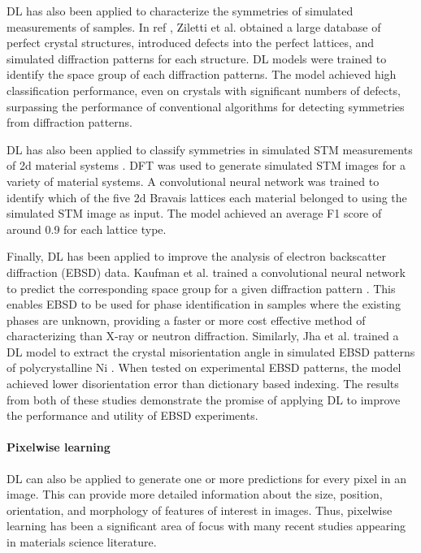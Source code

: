 \documentclass[pdflatex,sn-mathphys]{sn-jnl}%
\theoremstyle{thmstyleone}%
\theoremstyle{thmstyletwo}%
\theoremstyle{thmstylethree}%
\begin{document}
DL has also been applied to characterize the symmetries of simulated measurements of samples. In ref \cite{Ziletti2018}, Ziletti et al. obtained a large database of perfect crystal structures, introduced defects into the perfect lattices, and simulated diffraction patterns for each structure. DL models were trained to identify the space group of each diffraction patterns. The model achieved high classification performance, even on crystals with significant numbers of defects, surpassing the performance of conventional algorithms for detecting symmetries from diffraction patterns. 

DL has also been applied to classify symmetries in simulated STM measurements of 2d material systems \cite{choudhary2021computational}.  DFT was used to generate simulated STM images for a variety of material systems. A convolutional neural network was trained to identify which of the five 2d Bravais lattices each material belonged to using the simulated STM image as input. The model achieved an average F1 score of around 0.9 for each lattice type. 

Finally, DL has been applied to improve the analysis of electron backscatter diffraction (EBSD) data. Kaufman et al. trained a convolutional neural network to predict the corresponding space group for a given diffraction pattern \cite{Kaufmann2020PhaseID}. This enables EBSD to be used for phase identification in samples where the existing phases are unknown, providing a faster or more cost effective method of characterizing than X-ray or neutron diffraction.  Similarly, Jha et al. trained a DL model to extract the crystal misorientation angle in simulated EBSD patterns of polycrystalline Ni \cite{Jha2018}. When tested on experimental EBSD patterns, the model achieved lower disorientation error than dictionary based indexing. The results from both of these studies demonstrate the promise of applying DL to improve the performance and utility of EBSD experiments. 

\paragraph{Pixelwise learning}
DL can also be applied to generate one or more predictions for every pixel in an image. This can provide more detailed information about the size, position, orientation, and morphology of features of interest in images.  Thus, pixelwise learning has been a significant area of focus with many recent studies appearing in materials science literature.
\end{document}
